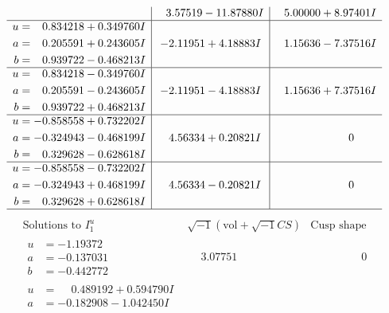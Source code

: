 \documentclass[1p]{elsarticle_modified}
\theoremstyle{definition}
\newcommand{\I}{\sqrt{-1}}
\begin{document}
$$\begin{array}{c|c|c}
 & \phantom{-}3.57519 - 11.87880 I & \phantom{-}5.00000 + 8.97401 I \\ \hline\begin{aligned}
u &= \phantom{-}0.834218 + 0.349760 I \\
a &= \phantom{-}0.205591 + 0.243605 I \\
b &= \phantom{-}0.939722 - 0.468213 I\end{aligned}
 & -2.11951 + 4.18883 I & \phantom{-}1.15636 - 7.37516 I \\ \hline\begin{aligned}
u &= \phantom{-}0.834218 - 0.349760 I \\
a &= \phantom{-}0.205591 - 0.243605 I \\
b &= \phantom{-}0.939722 + 0.468213 I\end{aligned}
 & -2.11951 - 4.18883 I & \phantom{-}1.15636 + 7.37516 I \\ \hline\begin{aligned}
u &= -0.858558 + 0.732202 I \\
a &= -0.324943 - 0.468199 I \\
b &= \phantom{-}0.329628 - 0.628618 I\end{aligned}
 & \phantom{-}4.56334 + 0.20821 I & \phantom{-0.000000 } 0 \\ \hline\begin{aligned}
u &= -0.858558 - 0.732202 I \\
a &= -0.324943 + 0.468199 I \\
b &= \phantom{-}0.329628 + 0.628618 I\end{aligned}
 & \phantom{-}4.56334 - 0.20821 I & \phantom{-0.000000 } 0\\
 \hline 
 \end{array}$$\newpage$$\begin{array}{c|c|c}  
\text{Solutions to }I^u_{1}& \I (\text{vol} + \sqrt{-1}CS) & \text{Cusp shape}\\
 \hline 
\begin{aligned}
u &= -1.19372\phantom{ +0.000000I} \\
a &= -0.137031\phantom{ +0.000000I} \\
b &= -0.442772\phantom{ +0.000000I}\end{aligned}
 & \phantom{-}3.07751\phantom{ +0.000000I} & \phantom{-0.000000 } 0 \\ \hline\begin{aligned}
u &= \phantom{-}0.489192 + 0.594790 I \\
a &= -0.182908 - 1.042450 I \\

\end{aligned}
\end{array}$$
\end{document}
